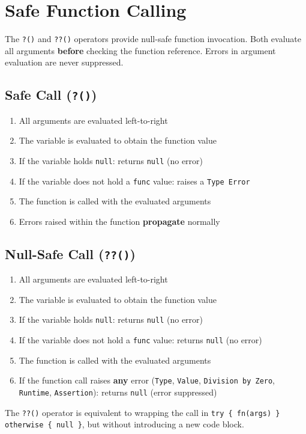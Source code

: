 \section{Safe Function Calling}
The \texttt{?()} and \texttt{??()} operators provide null-safe function invocation. Both evaluate all arguments \textbf{before} checking the function reference. Errors in argument evaluation are never suppressed.

\subsection{Safe Call (\texttt{?()})}
\begin{enumerate}
\item All arguments are evaluated left-to-right
\item The variable is evaluated to obtain the function value
\item If the variable holds \texttt{null}: returns \texttt{null} (no error)
\item If the variable does not hold a \texttt{func} value: raises a \texttt{Type Error}
\item The function is called with the evaluated arguments
\item Errors raised within the function \textbf{propagate} normally
\end{enumerate}

\subsection{Null-Safe Call (\texttt{??()})}
\begin{enumerate}
\item All arguments are evaluated left-to-right
\item The variable is evaluated to obtain the function value
\item If the variable holds \texttt{null}: returns \texttt{null} (no error)
\item If the variable does not hold a \texttt{func} value: returns \texttt{null} (no error)
\item The function is called with the evaluated arguments
\item If the function call raises \textbf{any} error (\texttt{Type}, \texttt{Value}, \texttt{Division by Zero}, \texttt{Runtime}, \texttt{Assertion}): returns \texttt{null} (error suppressed)
\end{enumerate}
The \texttt{??()} operator is equivalent to wrapping the call in \texttt{try \{ fn(args) \} otherwise \{ null \}}, but without introducing a new code block.

